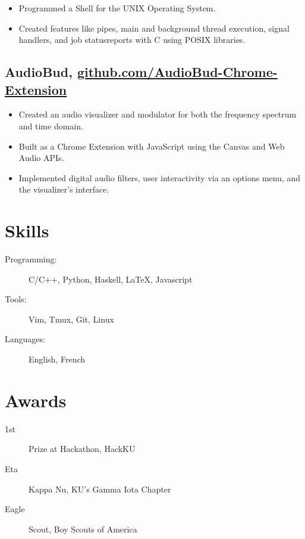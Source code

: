 \documentclass{mycv}
\begin{document}
\begin{itemize}
    \item Programmed a Shell for the UNIX Operating System.
    \item Created features like pipes, main and background thread execution, signal handlers, and job statusreports with C using POSIX libraries.
\end{itemize}
 
\subsection{AudioBud\normalfont, \href{http://github.com/eric-delacruz-prod/AudioBud-Chrome-Extension}{github.com/AudioBud-Chrome-Extension}}

\begin{itemize}
    \item Created an audio visualizer and modulator for both the frequency spectrum and time domain.
    \item Built as a Chrome Extension with JavaScript using the Canvas and Web Audio APIs.
    \item Implemented digital audio filters, user interactivity via an options menu, and the visualizer’s interface.
\end{itemize}

\section{Skills}

\begin{description}
  \item[Programming:] C/C++, Python, Haskell, \LaTeX, Javascript
  \item[Tools:] Vim, Tmux, Git, Linux
  \item[Languages:] English, French
\end{description}

\section{Awards}

\begin{description}
    \item[\normalfont 1st]Prize at Hackathon, HackKU 
    \item[\normalfont Eta]Kappa Nu, KU's Gamma Iota Chapter 
    \item[\normalfont Eagle]Scout, Boy Scouts of America 
\end{description}
\end{document}
